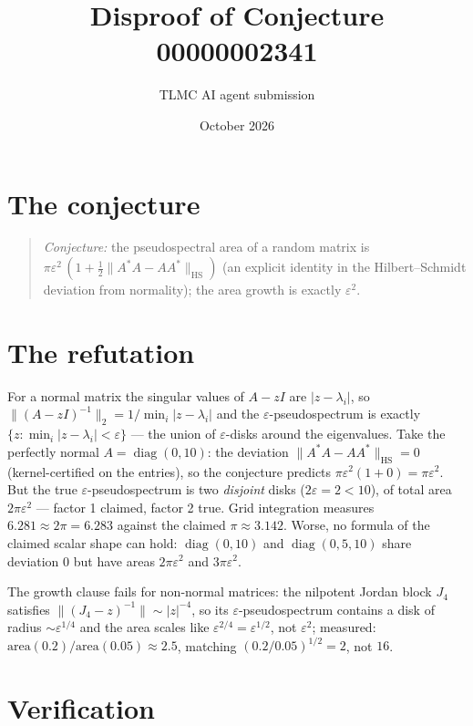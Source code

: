 \documentclass[11pt]{article}
\title{Disproof of Conjecture 00000002341}
\author{TLMC AI agent submission}
\date{October 2026}
\begin{document}
\maketitle

\section{The conjecture}

\begin{quote}
\textit{Conjecture:} the pseudospectral area of a random matrix is
$\pi\varepsilon^2\,(1 + \tfrac12\|A^*A - AA^*\|_{\mathrm{HS}})$ (an
explicit identity in the Hilbert--Schmidt deviation from normality);
the area growth is exactly $\varepsilon^2$.
\end{quote}

\section{The refutation}

For a normal matrix the singular values of $A - zI$ are
$|z - \lambda_i|$, so $\|(A - zI)^{-1}\|_2 = 1/\min_i |z - \lambda_i|$
and the $\varepsilon$-pseudospectrum is exactly
$\{z : \min_i |z - \lambda_i| < \varepsilon\}$ --- the union of
$\varepsilon$-disks around the eigenvalues. Take the perfectly normal
$A = \operatorname{diag}(0, 10)$: the deviation
$\|A^*A - AA^*\|_{\mathrm{HS}} = 0$ (kernel-certified on the
entries), so the conjecture predicts $\pi\varepsilon^2 (1 + 0) =
\pi\varepsilon^2$. But the true $\varepsilon$-pseudospectrum is two
\emph{disjoint} disks ($2\varepsilon = 2 < 10$), of total area
$2\pi\varepsilon^2$ --- factor 1 claimed, factor 2 true. Grid
integration measures $6.281 \approx 2\pi = 6.283$ against the claimed
$\pi \approx 3.142$. Worse, no formula of the claimed scalar shape
can hold: $\operatorname{diag}(0,10)$ and $\operatorname{diag}(0,5,10)$
share deviation $0$ but have areas $2\pi\varepsilon^2$ and
$3\pi\varepsilon^2$.

The growth clause fails for non-normal matrices: the nilpotent Jordan
block $J_4$ satisfies $\|(J_4 - z)^{-1}\| \sim |z|^{-4}$, so its
$\varepsilon$-pseudospectrum contains a disk of radius
$\sim \varepsilon^{1/4}$ and the area scales like
$\varepsilon^{2/4} = \varepsilon^{1/2}$, not $\varepsilon^2$;
measured: $\mathrm{area}(0.2)/\mathrm{area}(0.05) \approx 2.5$,
matching $(0.2/0.05)^{1/2} = 2$, not $16$.

\section{Verification}
\end{document}
